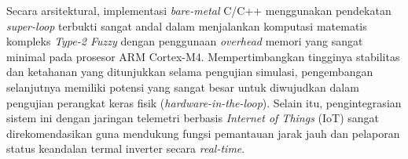 \documentclass[11pt,a4paper]{article}
\begin{document}
Secara arsitektural, implementasi \textit{bare-metal} C/C++ menggunakan pendekatan \textit{super-loop} terbukti sangat andal dalam menjalankan komputasi matematis kompleks \textit{Type-2 Fuzzy} dengan penggunaan \textit{overhead} memori yang sangat minimal pada prosesor ARM Cortex-M4. Mempertimbangkan tingginya stabilitas dan ketahanan yang ditunjukkan selama pengujian simulasi, pengembangan selanjutnya memiliki potensi yang sangat besar untuk diwujudkan dalam pengujian perangkat keras fisik (\textit{hardware-in-the-loop}). Selain itu, pengintegrasian sistem ini dengan jaringan telemetri berbasis \textit{Internet of Things} (IoT) sangat direkomendasikan guna mendukung fungsi pemantauan jarak jauh dan pelaporan status keandalan termal inverter secara \textit{real-time}.
\end{document}
